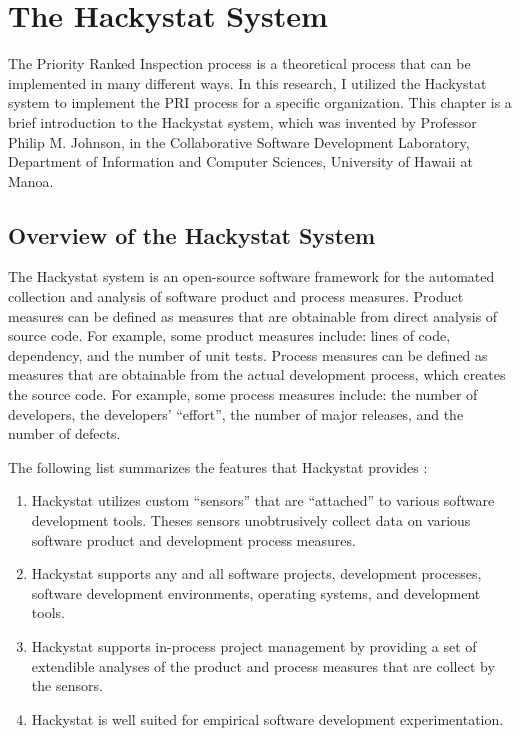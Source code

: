 
\chapter{The Hackystat System}
\label{chapter:hackystat}

The Priority Ranked Inspection process is a theoretical process that can be
implemented in many different ways. In this research, I utilized the
Hackystat system to implement the PRI process for a specific organization.
This chapter is a brief introduction to the Hackystat system, which was
invented by Professor Philip M. Johnson, in the Collaborative Software
Development Laboratory, Department of Information and Computer Sciences,
University of Hawaii at Manoa.

\section{Overview of the Hackystat System}
The Hackystat system is an open-source software framework for the automated
collection and analysis of software product and process measures. Product
measures can be defined as measures that are obtainable from direct
analysis of source code. For example, some product measures include: lines
of code, dependency, and the number of unit tests. Process measures can be
defined as measures that are obtainable from the actual development
process, which creates the source code. For example, some process measures
include: the number of developers, the developers' ``effort'', the number
of major releases, and the number of defects.

The following list summarizes the features that Hackystat provides
\cite{Johnson05}:

\begin{enumerate}
\item Hackystat utilizes custom ``sensors'' that are ``attached'' to
  various software development tools. Theses sensors unobtrusively collect
  data on various software product and development process measures. 
\item Hackystat supports any and all software projects, development
  processes, software development environments, operating systems, and
  development tools. 
\item Hackystat supports in-process project management by providing a set
  of extendible analyses of the product and process measures that are
  collect by the sensors.
\item Hackystat is well suited for empirical software development
  experimentation.
\end{enumerate}

